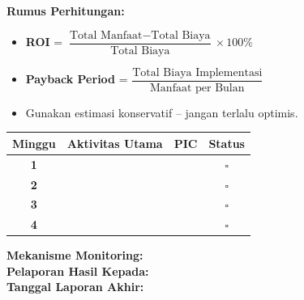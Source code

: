 \documentclass[12pt,a4paper]{report}
\newcommand{\fillline}[1][6cm]{\underline{\hspace{#1}}}
\begin{document}
\vspace{0.3cm}

\begin{tipbox}
\textbf{Rumus Perhitungan:}
\begin{itemize}
    \item \textbf{ROI} = $\dfrac{\text{Total Manfaat} - \text{Total Biaya}}{\text{Total Biaya}} \times 100\%$
    \item \textbf{Payback Period} = $\dfrac{\text{Total Biaya Implementasi}}{\text{Manfaat per Bulan}}$
    \item Gunakan estimasi konservatif -- jangan terlalu optimis.
\end{itemize}
\end{tipbox}

\vspace{0.3cm}

\begin{tcolorbox}[colback=plnorange!5, colframe=plnorange, sharp corners, title={\bfseries Action Plan 30 Hari}, boxrule=1pt]

\small
\renewcommand{\arraystretch}{2.2}
\begin{tabularx}{\textwidth}{@{} c >{\raggedright\arraybackslash}X >{\raggedright\arraybackslash}X c @{}}
\toprule
\textbf{Minggu} & \textbf{Aktivitas Utama} & \textbf{PIC} & \textbf{Status} \\
\midrule
\textbf{1} & & & $\square$ \\
\hline
\textbf{2} & & & $\square$ \\
\hline
\textbf{3} & & & $\square$ \\
\hline
\textbf{4} & & & $\square$ \\
\bottomrule
\end{tabularx}
\renewcommand{\arraystretch}{1.0}

\vspace{0.3cm}
\noindent\textbf{Mekanisme Monitoring:} \fillline[8cm]\\[0.2cm]
\noindent\textbf{Pelaporan Hasil Kepada:} \fillline[8cm]\\[0.2cm]
\noindent\textbf{Tanggal Laporan Akhir:} \fillline[8cm]

\end{tcolorbox}

\vspace{0.5cm}
\end{document}
